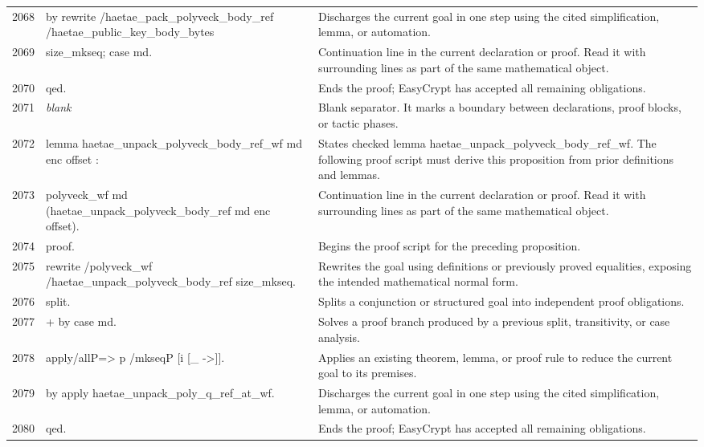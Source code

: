 \documentclass[10pt]{article}
\begin{document}
\begin{longtable}{r L{0.53\textwidth} L{0.37\textwidth}}
2068 & {\ttfamily\scriptsize by rewrite /haetae\_pack\_polyveck\_body\_ref /haetae\_public\_key\_body\_bytes} & Discharges the current goal in one step using the cited simplification, lemma, or automation. \\
2069 & {\ttfamily\scriptsize            size\_mkseq; case md.} & Continuation line in the current declaration or proof.  Read it with surrounding lines as part of the same mathematical object. \\
2070 & {\ttfamily\scriptsize qed.} & Ends the proof; EasyCrypt has accepted all remaining obligations. \\
2071 & {\ttfamily\scriptsize \emph{blank}} & Blank separator.  It marks a boundary between declarations, proof blocks, or tactic phases. \\
2072 & {\ttfamily\scriptsize lemma haetae\_unpack\_polyveck\_body\_ref\_wf md enc offset :} & States checked lemma haetae\_unpack\_polyveck\_body\_ref\_wf.  The following proof script must derive this proposition from prior definitions and lemmas. \\
2073 & {\ttfamily\scriptsize   polyveck\_wf md (haetae\_unpack\_polyveck\_body\_ref md enc offset).} & Continuation line in the current declaration or proof.  Read it with surrounding lines as part of the same mathematical object. \\
2074 & {\ttfamily\scriptsize proof.} & Begins the proof script for the preceding proposition. \\
2075 & {\ttfamily\scriptsize rewrite /polyveck\_wf /haetae\_unpack\_polyveck\_body\_ref size\_mkseq.} & Rewrites the goal using definitions or previously proved equalities, exposing the intended mathematical normal form. \\
2076 & {\ttfamily\scriptsize split.} & Splits a conjunction or structured goal into independent proof obligations. \\
2077 & {\ttfamily\scriptsize + by case md.} & Solves a proof branch produced by a previous split, transitivity, or case analysis. \\
2078 & {\ttfamily\scriptsize apply/allP=> p /mkseqP [i [\_ ->]].} & Applies an existing theorem, lemma, or proof rule to reduce the current goal to its premises. \\
2079 & {\ttfamily\scriptsize by apply haetae\_unpack\_poly\_q\_ref\_at\_wf.} & Discharges the current goal in one step using the cited simplification, lemma, or automation. \\
2080 & {\ttfamily\scriptsize qed.} & Ends the proof; EasyCrypt has accepted all remaining obligations. \\

\end{longtable}
\end{document}
